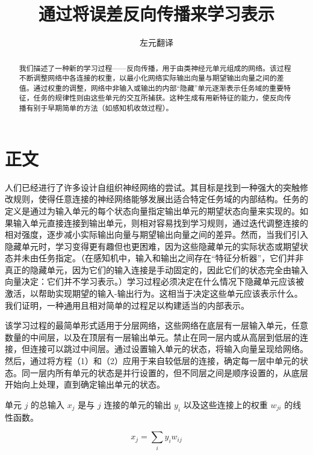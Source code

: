 \documentclass[lang=cn,a4paper,newtx]{elegantpaper}
\title{通过将误差反向传播来学习表示}
\author{左元翻译}
\begin{document}
\maketitle

\begin{abstract}
  我们描述了一种新的学习过程——反向传播，用于由类神经元单元组成的网络。该过程不断调整网络中各连接的权重，以最小化网络实际输出向量与期望输出向量之间的差值。通过权重的调整，网络中非输入或输出的内部“隐藏”单元逐渐表示任务域的重要特征，任务的规律性则由这些单元的交互所捕获。这种生成有用新特征的能力，使反向传播有别于早期简单的方法（如感知机收敛过程）。
\end{abstract}

\newpage

\tableofcontents

\newpage

\section{正文}

人们已经进行了许多设计自组织神经网络的尝试。其目标是找到一种强大的突触修改规则，使得任意连接的神经网络能够发展出适合特定任务域的内部结构。任务的定义是通过为输入单元的每个状态向量指定输出单元的期望状态向量来实现的。如果输入单元直接连接到输出单元，则相对容易找到学习规则，通过迭代调整连接的相对强度，逐步减小实际输出向量与期望输出向量之间的差异。然而，当我们引入隐藏单元时，学习变得更有趣但也更困难，因为这些隐藏单元的实际状态或期望状态并未由任务指定。（在感知机中，输入和输出之间存在“特征分析器”，它们并非真正的隐藏单元，因为它们的输入连接是手动固定的，因此它们的状态完全由输入向量决定：它们并不学习表示。）学习过程必须决定在什么情况下隐藏单元应该被激活，以帮助实现期望的输入-输出行为。这相当于决定这些单元应该表示什么。我们证明，一种通用且相对简单的过程足以构建适当的内部表示。

该学习过程的最简单形式适用于分层网络，这些网络在底层有一层输入单元，任意数量的中间层，以及在顶层有一层输出单元。禁止在同一层内或从高层到低层的连接，但连接可以跳过中间层。通过设置输入单元的状态，将输入向量呈现给网络。然后，通过将方程（1）和（2）应用于来自较低层的连接，确定每一层中单元的状态。同一层内所有单元的状态是并行设置的，但不同层之间是顺序设置的，从底层开始向上处理，直到确定输出单元的状态。

单元 $j$ 的总输入 $x_j$ 是与 $j$ 连接的单元的输出 $y_i$ 以及这些连接上的权重 $w_{ji}$ 的线性函数。

\begin{equation}
  x_j = \sum_{i} y_i w_{ij}
\end{equation}
\end{document}
